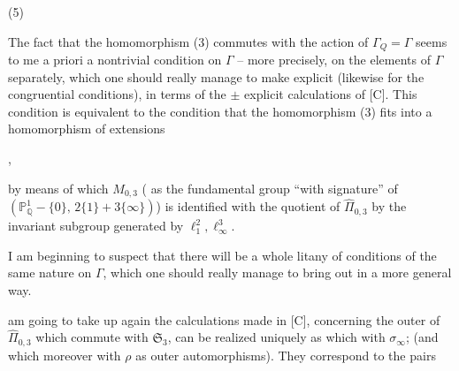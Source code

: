 (5)\quad
{}

The fact that the homomorphism
(3) commutes with the action of $\Gamma_Q=\Gamma$
seems to me  a priori a
nontrivial condition on $\Gamma$ -- more
precisely, on the elements of
$\Gamma$ separately, which one should really
manage to make explicit (likewise for the
congruential conditions), in
terms of the $\pm$ explicit
calculations of [C]. This condition is equivalent
to the condition that the homomorphism (3) fits
into a homomorphism of extensions



,

by means of which $M_{0,3}$ ( as the fundamental group ``with signature'' of $(\mathbb P^1_{\mathbb Q}-\{0\},\,2\{1\}+3\{\infty\})$) is identified with the quotient of $\widehat{\Pi}_{0,3}$ by the invariant  subgroup generated by $\ell_1^2,\ell_\infty^3$.

I am beginning to suspect that there will be a whole litany of conditions of the same nature on $\Gamma$, which one should really manage to bring out in a more general way.


 am going to take up again the calculations made in [C], concerning the outer  of $\widehat{\Pi}_{0,3}$ which commute with $\mathfrak S_3$,   can be realized uniquely as    which  with $\sigma_\infty$; (and which moreover  with $\rho$ as outer automorphisms). They correspond  to the pairs

